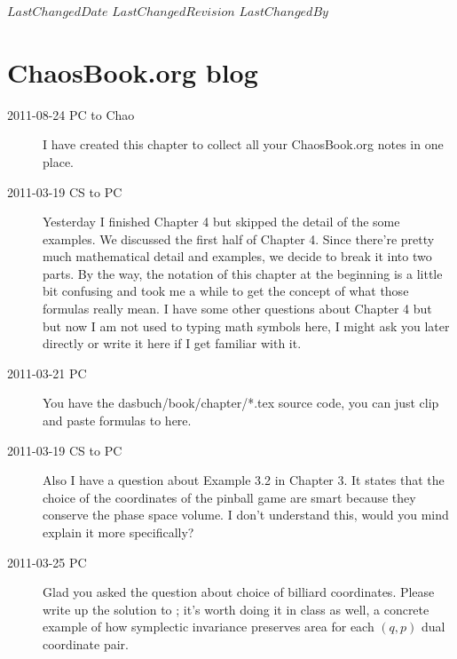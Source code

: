 \ifsvnmulti
{}
{$LastChangedDate$}
{$LastChangedRevision$} {$LastChangedBy$}
\fi


\chapter{ChaosBook.org blog}
\label{chap:ChaosBook}

\begin{description}

\item[2011-08-24 PC to Chao]
I have created this chapter to collect all your ChaosBook.org
notes in one place.


\item[2011-03-19 CS to PC]

   Yesterday I finished Chapter 4 but skipped the detail of the some
   examples. We discussed the first half of Chapter 4. Since there're
   pretty much mathematical detail and examples, we decide to break it
   into two parts. By the way, the notation of this chapter at the
   beginning is a little bit confusing and took me a while to get the
   concept of what those formulas really mean. I have some other
   questions about Chapter 4 but but now I am not used to typing math
   symbols here, I might ask you later directly or write it here if I get
   familiar with it.

\item[2011-03-21 PC] You have the dasbuch/book/chapter/*.tex source
code, you can just clip and paste formulas to here.

\item[2011-03-19 CS to PC]
Also I have a question about Example 3.2 in Chapter 3. It states that
   the choice of the coordinates of the pinball game are smart because
   they conserve the phase space volume. I don't understand this, would
   you mind explain it more specifically?

\item[2011-03-25 PC]
Glad you asked the question about choice of billiard coordinates. Please
write up the solution to ; it's worth doing it in
class as well, a concrete example of how symplectic invariance preserves
area for each $(q,p)$ dual coordinate  pair.


\end{description}
